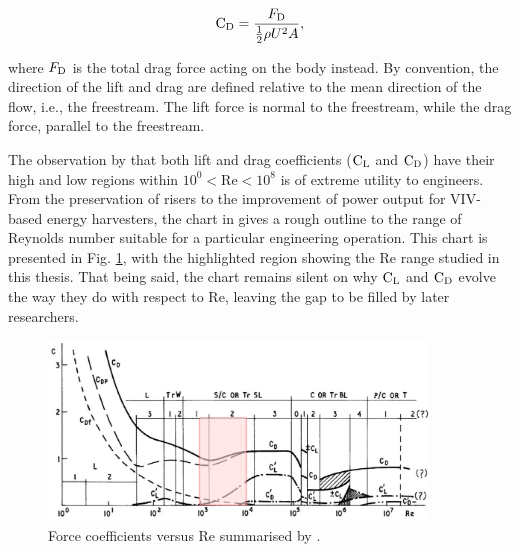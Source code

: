 \documentclass[oneside]{utmthesis}
\begin{document}
\begin{equation}
  \text{C}_{\text{D}} = \frac{F_{\text{D}}}{\frac{1}{2}\rho U^{2} A},
  \label{eq:cdDef}
\end{equation}

\noindent where $F_{\text{D}}$ is the total drag force acting on the body instead. By convention, the direction of the lift and drag are defined relative to the mean direction of the flow, i.e., the freestream. The lift force is normal to the freestream, while the drag force, parallel to the freestream.

The observation by \citet{Zdravkovich1997} that both lift and drag coefficients ($\text{C}_{\text{L}}$ and $\text{C}_{\text{D}}$) have their high and low regions within $10^{0} < \text{Re} < 10^{8}$ is of extreme utility to engineers. From the preservation of risers to the improvement of power output for VIV-based energy harvesters, the chart in \citet{Zdravkovich1997} gives a rough outline to the range of Reynolds number suitable for a particular engineering operation. This chart is presented in Fig. \ref{fig:zdravkovichMap}, with the highlighted region showing the Re range studied in this thesis. That being said, the chart remains silent on why $\text{C}_{\text{L}}$ and $\text{C}_{\text{D}}$ evolve the way they do with respect to Re, leaving the gap to be filled by later researchers.

\begin{figure}[!h]
  \centering
  \hspace{1cm} \includegraphics[width=0.9\textwidth]{figs/zdravkovichMap}
  \caption{Force coefficients versus Re summarised by \citet{Zdravkovich1997}.}
  \label{fig:zdravkovichMap}
\end{figure}
\end{document}
